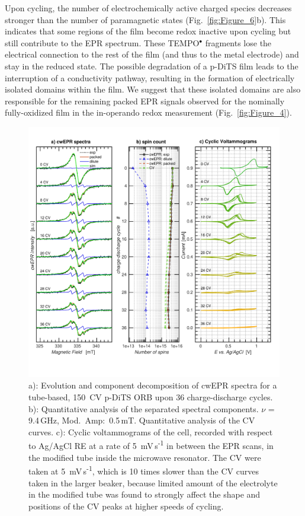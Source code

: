 \par
Upon cycling, the number of electrochemically active charged species decreases stronger than the number of paramagnetic states (Fig.~\ref{fig:Figure_6}b). This  indicates that some regions of the film become redox inactive upon cycling but still contribute to the EPR spectrum. These TEMPO$^{\bullet}$ fragments lose the electrical connection to the rest of the film (and thus to the metal electrode) and stay in the reduced state. The possible degradation of a p-DiTS film leads to the interruption of a conductivity pathway, resulting in the formation of electrically isolated domains within the film. We suggest that these isolated domains are also responsible for the remaining packed EPR signals observed for the nominally fully-oxidized film in the in-operando redox measurement (Fig.~\ref{fig:Figure_4}).


\begin{figure}[!h]
\center
	\includegraphics[width=1\textwidth]{./operando_epr/figures/degradation/repeated_cycling_degradation_dits.pdf}
	\caption{a): Evolution and component decomposition of cwEPR spectra for a tube-based, 150~CV p-DiTS ORB upon 36 charge-discharge cycles. b): Quantitative analysis of the separated spectral components. $\nu$ = 9.4$\,$GHz, Mod.~Amp:~0.5$\,$mT. Quantitative analysis of the CV curves. c): Cyclic voltammograms of the cell, recorded with respect to Ag/AgCl RE at a rate of 5~mV\,s\textsuperscript{-1} in between the EPR scans, in the modified tube inside the microwave resonator. The CV were taken at 5~mV\,s\textsuperscript{-1}, which is 10 times slower than the CV curves taken in the larger beaker, because limited amount of the electrolyte in the modified tube was found to strongly affect the shape and positions of the CV peaks at higher speeds of cycling.}
	\label{fig:repeated_cycling_degradation}
\end{figure}


